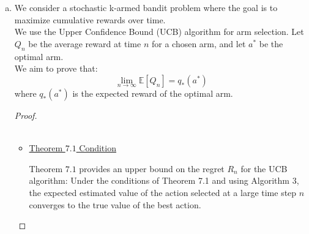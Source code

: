 \documentclass{article}
\begin{document}
\begin{enumerate}[a)]
\begin{itemize}
\begin{enumerate}
    \item \textbf{Choosing \( u_i \) and \( c \):}\par 
    The choice of \( u_i \) is made to ensure that the upper confidence bound for suboptimal arm \( a_i \) is properly controlled. A natural choice for \( u_i \), considering the balance between exploration and exploitation, is given by:
    \[ u_i = \left\lceil \frac{2 \log(1/\delta)}{(1 - c)^2 \Delta_i^2} \right\rceil \]
    where \( \delta \) is the confidence level parameter, and \( c \) is a constant. 

    In the proof, \( c \) is chosen to be \( 1/2 \) somewhat arbitrarily but in a way that balances the two terms in the regret bound. This choice leads to a simplification of the regret bound while maintaining a balance between exploration and exploitation.

    \item \textbf{Finalizing the Bound on \( R_t \):}\par 
    With \( u_i \) and \( c \) chosen, the final bound on \( R_t \) is derived by substituting these values into the regret decomposition:
    \[ R_t \leq \sum_{i: \Delta_i > 0} \Delta_i \left( \left\lceil \frac{2 \log(1/\delta)}{(1 - c)^2 \Delta_i^2} \right\rceil + t P(G^c_i) \right) \]
    Applying the choice of \( c = 1/2 \), the final bound simplifies to:
    \[ R_t \leq 3 \sum_{i=1}^{k} \Delta_i + \sum_{i: \Delta_i > 0} \frac{16 \log(t)}{\Delta_i} \]
\end{enumerate}

        
        
    \end{itemize}
    
    \item 
    We consider a stochastic k-armed bandit problem where the goal is to maximize cumulative rewards over time.\\ 
    We use the Upper Confidence Bound (UCB) algorithm for arm selection. Let $Q_n$ be the average reward at time $n$ for a chosen arm, and let $a^*$ be the optimal arm.\\ 
    We aim to prove that:
    \[ \lim_{n \to \infty} \mathbb{E}[Q_n] = q_{*}(a^*) \]
    where $q_{*}(a^*)$ is the expected reward of the optimal arm.

    \begin{proof}
        \renewcommand{\qedsymbol}{$\blacksquare$}
        \hfill\\\\
        \begin{itemize}
            \item \underline{Theorem $7.1$ Condition}\par
            Theorem $7.1$ provides an upper bound on the regret $R_n$ for the UCB algorithm:
            Under the conditions of Theorem 7.1 and using Algorithm 3, the expected estimated value of the action selected at a large time step $n$ converges to the true value of the best action.


\end{itemize}
\end{proof}
\end{enumerate}
\end{document}
